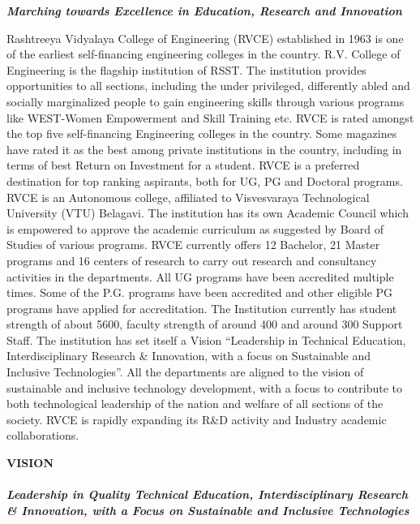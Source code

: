 \documentclass[12pt,a4paper]{article}
\begin{document}
{\begin{center}
\textit{\textbf{Marching towards Excellence in Education, Research and Innovation}}\end{center}
Rashtreeya Vidyalaya College of Engineering (RVCE) established in 1963 is one of the earliest self-financing engineering colleges in the country.  R.V. College of Engineering is the flagship institution of RSST. The institution provides opportunities to all sections, including the under privileged, differently abled and socially marginalized people to gain engineering skills through various programs like WEST-Women Empowerment and Skill Training etc.
RVCE is rated amongst the top five self-financing Engineering colleges in the country. Some magazines have rated it as the best among private institutions in the country, including in terms of best Return on Investment for a student. RVCE is a preferred destination for top ranking aspirants, both for UG, PG and Doctoral programs. RVCE is an Autonomous college, affiliated to Visvesvaraya Technological University (VTU) Belagavi. The institution has its own Academic Council which is empowered to approve the academic curriculum as suggested by Board of Studies of various programs. RVCE currently offers 12 Bachelor, 21 Master programs and 16 centers of research to carry out research and consultancy activities in the departments. All UG programs have been accredited multiple times. Some of the P.G. programs have been accredited and other eligible PG programs have applied for accreditation. The Institution currently has student strength of about 5600, faculty strength of around 400 and around 300 Support Staff. 
The institution has set itself a Vision “Leadership in Technical Education, Interdisciplinary Research \& Innovation, with a focus on Sustainable and Inclusive Technologies”.  All the departments are aligned to the vision of sustainable and inclusive technology development, with a focus to contribute to both technological leadership of the nation and welfare of all sections of the society. RVCE is rapidly expanding its R\&D activity and Industry academic collaborations.}\vspace{0.3cm}

\thispagestyle{plain}
\begin{center}\textbf{\large{VISION}}\\
\textit{\textbf{\\Leadership in Quality Technical Education, Interdisciplinary Research \& Innovation, with a Focus on Sustainable and Inclusive Technologies}}\end{center}\vspace{0.3cm}
\end{document}
